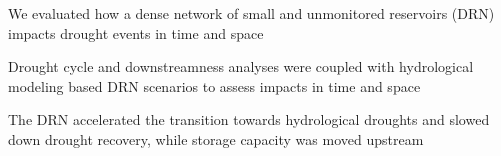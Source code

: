 \documentclass[draft]{agujournal2019}
\begin{document}

\begin{keypoints}
\item We evaluated how a dense network of small and unmonitored reservoirs (DRN) impacts drought events in time and space
\item Drought cycle and downstreamness analyses were coupled with hydrological modeling based DRN scenarios to assess impacts in time and space
\item The DRN accelerated the transition towards hydrological droughts and slowed down drought recovery, while storage capacity was moved upstream
\end{keypoints}

%
%

%
%
\end{document}
